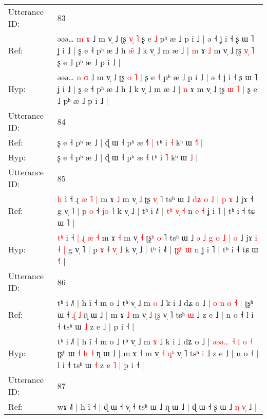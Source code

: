 \documentclass[10pt]{article}
\DeclareRobustCommand{\hl}[1]{{\textcolor{red}{#1}}}
\begin{document}
\begin{longtable}{ll}
\midrule
Utterance ID: & 83 \\
Ref: & əəə… \hl{m} \hl{ɤ} ˩ m v̩ ˩ ʈʂ \hl{}\hl{v}\hl{̩} \hl{˥} ʂ e \hl{˩} pʰ æ ˩ p i ˩ | ə ˧ ʝ i ˧ ʂ ɯ ˥ ʝ i ˩ | ʂ e ˧ pʰ æ ˩ h\hl{ }\hl{æ}\hl{̃} ˩ k v̩ ˩ m æ ˩ | \hl{m} ɤ\hl{ }\hl{˩} m v̩ ˩ ʈʂ \hl{}\hl{v}\hl{̩} \hl{˥} ʂ e ˩ pʰ æ ˩ p i ˩ |
 \\
Hyp: & əəə… \hl{n} \hl{ɑ} ˩ m v̩ ˩ ʈʂ \hl{o}\hl{ }\hl{˥} \hl{|} ʂ e \hl{˧} pʰ æ ˩ p i ˩ | ə ˧ ʝ i ˧ ʂ ɯ ˥ ʝ i ˩ | ʂ e ˧ pʰ æ ˩ h\hl{}\hl{}\hl{} ˩ k v̩ ˩ m æ ˩ | \hl{n} ɤ\hl{}\hl{} m v̩ ˩ ʈʂ \hl{ɯ}\hl{ }\hl{˥} \hl{|} ʂ e ˩ pʰ æ ˩ p i ˩ |
 \\
\midrule
Utterance ID: & 84 \\
Ref: & ʂ e ˧ pʰ æ ˩ | ɖ ɯ ˧ pʰ æ ˧\hl{˥}\hl{ }\hl{|} tʰ i \hl{˧} kʰ ɯ \hl{˧}\hl{˥} |
 \\
Hyp: & ʂ e ˧ pʰ æ ˩ | ɖ ɯ ˧ pʰ æ ˧\hl{}\hl{}\hl{} tʰ i \hl{˥} kʰ ɯ \hl{}\hl{˩} |
 \\
\midrule
Utterance ID: & 85 \\
Ref: & \hl{}\hl{h} i\hl{̃} ˧ \hl{ɻ} \hl{æ} \hl{˥} \hl{|} m ɤ \hl{˩} m v̩ \hl{˩} ʈʂ\hl{ }\hl{v}\hl{̩} ˥ tsʰ ɯ ˩ \hl{}\hl{d}\hl{ʑ} \hl{o} \hl{˩} \hl{|} \hl{p} \hl{ɤ} ˩ jɤ\hl{}\hl{} ˧\hl{}\hl{} g v̩ ˥ | p \hl{o} ˧ \hl{j}\hl{o} \hl{˥} k v̩ ˩ | tʰ i ˩˥ | \hl{t}\hl{ʰ}\hl{ }\hl{v}\hl{̩} \hl{˧} n\hl{ }\hl{e}\hl{ }\hl{˧} ʝ i ˥ | tʰ i ˧ tɕ ɯ \hl{}˥ |
 \\
Hyp: & \hl{t}\hl{ʰ} i\hl{} ˧ \hl{|} \hl{ɻ} \hl{æ} \hl{˧} m ɤ \hl{˧} m v̩ \hl{˧} ʈʂ\hl{ʰ}\hl{ }\hl{o} ˥ tsʰ ɯ ˩ \hl{ə}\hl{ }\hl{˩} \hl{g} \hl{o} \hl{˩} \hl{|} \hl{o} ˩ jɤ\hl{ }\hl{i} ˧\hl{ }\hl{|} g v̩ ˥ | p \hl{ɤ} ˧ \hl{v}\hl{̩} \hl{˩} k v̩ ˩ | tʰ i ˩˥ | \hl{}\hl{}\hl{ʈ}\hl{ʂ}\hl{ʰ} \hl{ɯ} n\hl{}\hl{}\hl{}\hl{} ʝ i ˥ | tʰ i ˧ tɕ ɯ \hl{˧}˥ |
 \\
\midrule
Utterance ID: & 86 \\
Ref: & tʰ i ˩˥ | h ĩ ˧ m o ˩ tʰ v̩ ˩ m \hl{o} ˩ k i ˩ dʑ o ˩ | \hl{}\hl{}\hl{}\hl{o} \hl{n} \hl{o} \hl{˧} \hl{|} ʈʂʰ ɯ ˧ \hl{ɻ}\hl{̍} \hl{˩} ɳ ɯ ˩ | m ɤ \hl{˩} m v̩ \hl{˩} \hl{ʈ}\hl{ʂ} v̩ ˥ tsʰ \hl{ɯ} ˩ z e ˩ | n o ˧\hl{}\hl{} l i ˧ tsʰ ɯ \hl{˩} z e \hl{˩} | p i ˧ |
 \\
Hyp: & tʰ i ˩˥ | h ĩ ˧ m o ˩ tʰ v̩ ˩ m \hl{ɤ} ˩ k i ˩ dʑ o ˩ | \hl{ə}\hl{ə}\hl{ə}\hl{…} \hl{˧} \hl{l} \hl{o} \hl{˧} ʈʂʰ ɯ ˧ \hl{}\hl{h} \hl{˧} ɳ ɯ ˩ | m ɤ \hl{˧} m v̩ \hl{˧} \hl{q}\hl{ʰ} v̩ ˥ tsʰ \hl{i} ˩ z e ˩ | n o ˧\hl{ }\hl{|} l i ˧ tsʰ ɯ \hl{˧} z e \hl{˥} | p i ˧ |
 \\
\midrule
Utterance ID: & 87 \\
Ref: & wɤ ˩˥ | h ĩ ˧ | ɖ ɯ ˧ v̩ ˧ tsʰ ɯ ˩ ɳ ɯ ˩ | ɖ ɯ ˧ ʂ ɯ ˩ \hl{ŋ} \hl{v}\hl{̩} ˩ |

\end{longtable}
\end{document}

